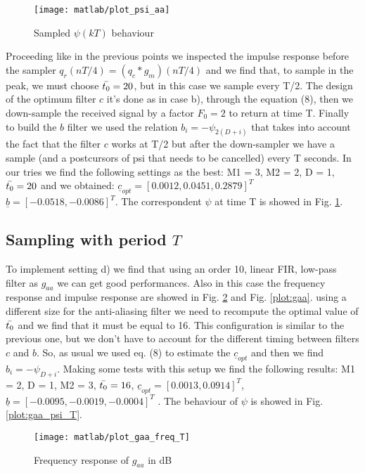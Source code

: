 \documentclass[a4paper,oneside]{article}
\renewcommand{\vec}[1]{\underline{#1}}
\begin{document}
\begin{figure}[h]
  \centering
  \texttt{[image: matlab/plot\_psi\_aa]}
  \caption{Sampled $\psi(kT)$ behaviour}
  \label{plot:psi_aa}
\end{figure}
Proceeding like in the previous points we inspected the impulse response before the sampler $q_r(n T/4) = (q_c * g_m)(n T/4)$ and we find that, to sample in the peak, we must choose $\Bar{t_0} = 20$, but in this case we sample every T/2. The design of the optimum filter $c$ it's done as in case b), through the equation (8), then we down-sample the received signal by a factor $F_0 = 2$ to return at time T. Finally to build the $b$ filter we used the relation $b_i = - \psi_{2(D+i)}$ that takes into account the fact that the filter $c$ works at T/2 but after the down-sampler we have a sample (and a postcursors of psi that needs to be cancelled) every T seconds. In our tries we find the following settings as the best: M1 = 3, M2 = 2, D = 1, $\Bar{t_0} = 20$ and we obtained: $\vec{c}_{opt} = [0.0012, 0.0451, 0.2879]^T$ $\vec{b} = [-0.0518, -0.0086]^T$. The correspondent $\psi$ at time T is showed in Fig. \ref{plot:psi_aa}.

\subsection{Sampling with period $T$}
To implement setting d) we find that using an order 10, linear FIR, low-pass filter as $g_{aa}$ we can get good performances. Also in this case the frequency response and impulse response are showed in Fig. \ref{plot:gaa_freq_T} and Fig. \ref{plot:gaa}. using a different size for the anti-aliasing filter we need to recompute the optimal value of $\Bar{t_0}$ and we find that it must be equal to 16. This configuration is similar to the previous one, but we don't have to account for the different timing between filters $c$ and $b$. So, as usual we used eq. (8) to estimate the $\vec{c}_{opt}$ and then we find $b_i = -\psi_{D+i}$. Making some tests with this setup we find the following results: M1 = 2, D = 1, M2 = 3, $\Bar{t_0} = 16$, $\vec{c}_{opt} = [0.0013, 0.0914]^T$, $\vec{b} = [-0.0095, -0.0019, -0.0004]^T$ . The behaviour of $\psi$ is showed in Fig. \ref{plot:gaa_psi_T}.
\begin{figure}[h]
  \centering
  \texttt{[image: matlab/plot\_gaa\_freq\_T]}
  \caption{Frequency response of $g_{aa}$ in dB}
  \label{plot:gaa_freq_T}
\end{figure}
\end{document}
